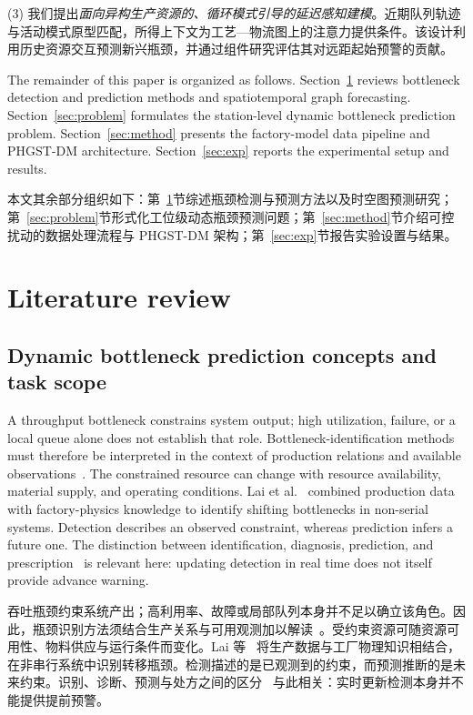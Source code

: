 \documentclass[a4paper,fleqn]{cas-dc}
\newcommand{\zhpara}[1]{%
  \par\begingroup\small\color{black!72}\noindent #1\par\endgroup}
\begin{document}
\zhpara{(3) 我们提出\emph{面向异构生产资源的、循环模式引导的延迟感知建模}。近期队列轨迹与活动模式原型匹配，所得上下文为工艺—物流图上的注意力提供条件。该设计利用历史资源交互预测新兴瓶颈，并通过组件研究评估其对远距起始预警的贡献。}


The remainder of this paper is organized as follows. Section~\ref{sec:review} reviews bottleneck detection and prediction methods and spatiotemporal graph forecasting. Section~\ref{sec:problem} formulates the station-level dynamic bottleneck prediction problem. Section~\ref{sec:method} presents the factory-model data pipeline and PHGST-DM architecture. Section~\ref{sec:exp} reports the experimental setup and results.

\zhpara{本文其余部分组织如下：第~\ref{sec:review}节综述瓶颈检测与预测方法以及时空图预测研究；第~\ref{sec:problem}节形式化工位级动态瓶颈预测问题；第~\ref{sec:method}节介绍可控扰动的数据处理流程与 PHGST-DM 架构；第~\ref{sec:exp}节报告实验设置与结果。}


\section{Literature review} \label{sec:review}

\subsection{Dynamic bottleneck prediction concepts and task scope}

A throughput bottleneck constrains system output; high utilization, failure, or a local queue alone does not establish that role. Bottleneck-identification methods must therefore be interpreted in the context of production relations and available observations~\cite{subramaniyan2023throughput}. The constrained resource can change with resource availability, material supply, and operating conditions. Lai et al.~\cite{lai2021data} combined production data with factory-physics knowledge to identify shifting bottlenecks in non-serial systems. Detection describes an observed constraint, whereas prediction infers a future one. The distinction between identification, diagnosis, prediction, and prescription~\cite{subramaniyan2021ai} is relevant here: updating detection in real time does not itself provide advance warning.

\zhpara{吞吐瓶颈约束系统产出；高利用率、故障或局部队列本身并不足以确立该角色。因此，瓶颈识别方法须结合生产关系与可用观测加以解读~\cite{subramaniyan2023throughput}。受约束资源可随资源可用性、物料供应与运行条件而变化。Lai 等~\cite{lai2021data} 将生产数据与工厂物理知识相结合，在非串行系统中识别转移瓶颈。检测描述的是已观测到的约束，而预测推断的是未来约束。识别、诊断、预测与处方之间的区分~\cite{subramaniyan2021ai} 与此相关：实时更新检测本身并不能提供提前预警。}
\end{document}
